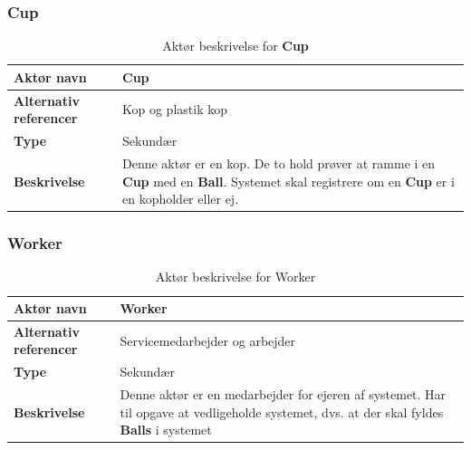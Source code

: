 \documentclass[Kravspecifikation/Kravspec_Main.tex]{subfiles}
\begin{document}
\subsubsection{Cup}
\begin{table}[H]
    \centering
    \begin{tabular}{|L{0.35\textwidth}|L{0.65\textwidth}|}
        \hline
        \textbf{Aktør navn} &  Cup\\ \hline
        \textbf{Alternativ referencer} &  Kop og plastik kop\\ \hline
        \textbf{Type} & Sekundær \\ \hline
        \textbf{Beskrivelse} & Denne aktør er en kop. De to hold prøver at ramme i en \textbf{Cup} med en \textbf{Ball}. Systemet skal registrere om en \textbf{Cup} er i en kopholder eller ej.  \\ \hline
    \end{tabular}
    \caption{Aktør beskrivelse for \textbf{Cup}}
    \label{tab:CupBeskrivelse}
\end{table}

\subsubsection{Worker}
\begin{table}[H]
    \centering
    \begin{tabular}{|L{0.35\textwidth}|L{0.65\textwidth}|}
        \hline
        \textbf{Aktør navn} & Worker \\ \hline
        \textbf{Alternativ referencer} & Servicemedarbejder og arbejder \\ \hline
        \textbf{Type} & Sekundær\\ \hline
        \textbf{Beskrivelse} & Denne aktør er en medarbejder for ejeren af systemet. Har til opgave at vedligeholde systemet, dvs. at der skal fyldes \textbf{Balls} i systemet\\ \hline
    \end{tabular}
    \caption{Aktør beskrivelse for Worker}
    \label{tab:WorkerBeskrivelse}
\end{table}
\end{document}
